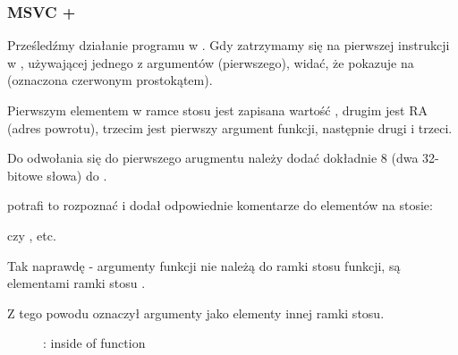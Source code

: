 \subsubsection{MSVC + \olly}
\myindex{\olly}
Prześledźmy działanie programu w \olly.
Gdy zatrzymamy się na pierwszej instrukcji w \ttf, używającej jednego z argumentów (pierwszego),
widać, że \EBP pokazuje na  (oznaczona czerwonym prostokątem).

Pierwszym elementem w ramce stosu jest zapisana wartość \EBP,
drugim jest \ac{RA} (adres powrotu), trzecim jest pierwszy argument funkcji, następnie drugi i trzeci.

Do odwołania się do pierwszego arugmentu należy dodać dokładnie 8 (dwa 32-bitowe słowa) do \EBP.

\olly potrafi to rozpoznać i dodał odpowiednie komentarze do elementów na stosie:

 czy , etc.

Tak naprawdę - argumenty funkcji nie należą do ramki stosu funkcji, są elementami ramki stosu .

Z tego powodu \olly oznaczył argumenty  jako elementy innej ramki stosu.

\begin{figure}[H]
\centering
{}
\caption{\olly: inside of \ttf{} function}
\label{fig:passing_arguments_olly}
\end{figure}

